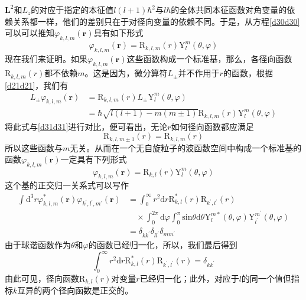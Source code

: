 \documentclass[]{article}
\begin{document}
$\boldsymbol{L}^2$和$L_z$的对应于指定的本征值$l(l+1)\hbar^2$与$l\hbar$的全体共同本征函数对角变量的依赖关系都一样，他们的差别只在于对径向变量的依赖不同。于是，从方程\eqref{d30d30}可以可以推知$\varphi_{k,l,m}(\boldsymbol{r})$具有如下形式
\begin{equation}
	\varphi_{k,l,m}(\boldsymbol{r})=\mathrm{R}_{k,l,m}(r)\mathrm{Y}_l^m(\theta,\varphi)
\end{equation}
现在我们来证明。如果$\varphi_{k,l,m}(\boldsymbol{r})$这些函数构成一个标准基，那么，各径向函数$\mathrm{R}_{k,l,m}(r)$都不依赖$m$。这是因为，微分算符$L_\pm$并不作用于$r$的函数，根据\eqref{d21d21}，我们有
\begin{align}
	L_\pm\varphi_{k,l,m}(\boldsymbol{r})&=\mathrm{R}_{k,l,m}(r)L_\pm\mathrm{Y}_l^m(\theta,\varphi)\nonumber\\
	&=\hbar\sqrt{l(l+1)-m(m\pm1)}\mathrm{R}_{k,l,m}(r)\mathrm{Y}_l^m(\theta,\varphi)
\end{align}
将此式与\eqref{d31d31}进行对比，便可看出，无论$r$如何径向函数都应满足
\begin{equation}
	\mathrm{R}_{k,l,m\pm1}(r)=\mathrm{R}_{k,l,m}(r)
\end{equation}
所以这些函数与$m$无关。从而在一个无自旋粒子的波函数空间中构成一个标准基的函数$\varphi_{k,l,m}(\boldsymbol{r})$一定具有下列形式
\begin{equation}
	\varphi_{k,l,m}(\boldsymbol{r})=\mathrm{R}_{k,l}(r)\mathrm{Y}_l^m(\theta,\varphi)
\end{equation}
这个基的正交归一关系式可以写作
\begin{align}
	\int\mathrm{d}^3r\varphi_{k,l,m}^*(\boldsymbol{r})\varphi_{k^\prime,l^\prime,m^\prime}(\boldsymbol{r})&=\int_{0}^{\infty}r^2\mathrm{d}r\mathrm{R}^*_{k,l}(r)\mathrm{R}_{k^\prime,l^\prime}(r)\nonumber\\
	&\quad\times\int_{0}^{2\pi}\mathrm{d}\varphi\int_{0}^{\pi}\mathrm{sin}\theta\mathrm{d}\theta\mathrm{Y}_l^{m*}(\theta,\varphi)\mathrm{Y}_{l^\prime}^{m^\prime}(\theta,\varphi)\nonumber\\
	&=\delta_{kk^\prime}\delta_{ll^\prime}\delta_{mm^\prime}
\end{align}
由于球谐函数作为$\theta$和$\varphi$的函数已经归一化，所以，我们最后得到
\begin{equation}
	\int_{0}^{\infty}r^2\mathrm{d}r\mathrm{R}^*_{k,l}(r)\mathrm{R}_{k^\prime,l^\prime}(r)=\delta_{kk^\prime}
	\label{d37d37}
\end{equation}
由此可见，径向函数$\mathrm{R}_{k,l}(r)$对变量$r$已经归一化；此外，对应于$l$的同一个值但指标$k$互异的两个径向函数是正交的。
\end{document}
